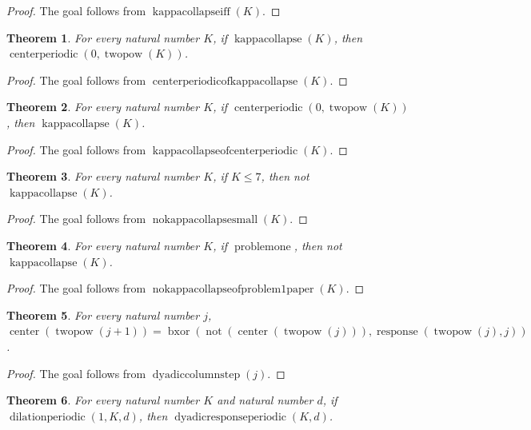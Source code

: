 \documentclass[11pt]{article}
\newtheorem{theorem}{Theorem}[section]
\theoremstyle{definition}
\begin{document}
\begin{proof}
The goal follows from \(\operatorname{kappacollapseiff}(K)\).
\end{proof}
\begin{theorem}
\label{ll:observations:center-periodic-of-kappa-collapse}
For every natural number \(K\), if \(\operatorname{kappacollapse}(K)\), then \(\operatorname{centerperiodic}(0, \operatorname{twopow}(K))\).
\end{theorem}
\begin{proof}
The goal follows from \(\operatorname{centerperiodicofkappacollapse}(K)\).
\end{proof}
\begin{theorem}
\label{ll:observations:kappa-collapse-of-center-periodic}
For every natural number \(K\), if \(\operatorname{centerperiodic}(0, \operatorname{twopow}(K))\), then \(\operatorname{kappacollapse}(K)\).
\end{theorem}
\begin{proof}
The goal follows from \(\operatorname{kappacollapseofcenterperiodic}(K)\).
\end{proof}
\begin{theorem}
\label{ll:observations:no-kappa-collapse-small}
For every natural number \(K\), if \(K \le 7\), then not \(\operatorname{kappacollapse}(K)\).
\end{theorem}
\begin{proof}
The goal follows from \(\operatorname{nokappacollapsesmall}(K)\).
\end{proof}
\begin{theorem}
\label{ll:observations:no-kappa-collapse-of-problem1-paper}
For every natural number \(K\), if \(\operatorname{problemone}\), then not \(\operatorname{kappacollapse}(K)\).
\end{theorem}
\begin{proof}
The goal follows from \(\operatorname{nokappacollapseofproblem1paper}(K)\).
\end{proof}
\begin{theorem}
\label{ll:observations:dyadic-column-step}
For every natural number \(j\), \(\operatorname{center}(\operatorname{twopow}(j + 1)) = \operatorname{bxor}(\operatorname{not}(\operatorname{center}(\operatorname{twopow}(j))), \operatorname{response}(\operatorname{twopow}(j), j))\).
\end{theorem}
\begin{proof}
The goal follows from \(\operatorname{dyadiccolumnstep}(j)\).
\end{proof}
\begin{theorem}
\label{ll:observations:dyadic-response-periodic-of-dilation-periodic}
For every natural number \(K\) and natural number \(d\), if \(\operatorname{dilationperiodic}(1, K, d)\), then \(\operatorname{dyadicresponseperiodic}(K, d)\).
\end{theorem}
\end{document}
